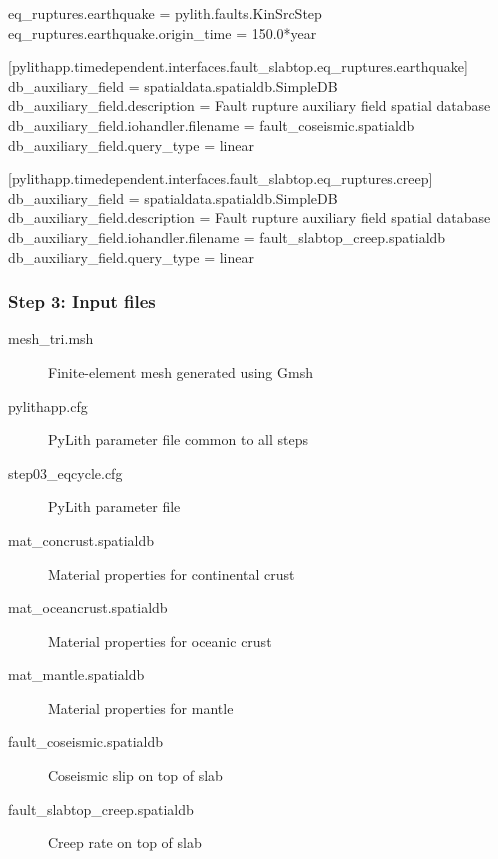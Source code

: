 \documentclass[aspectratio=169]{beamer}
\begin{document}
\begin{frame}[t,fragile]
\begin{minipage}[t]{0.67\textwidth}
\begin{onlyenv}
\begin{cfgcode}
        eq_ruptures.earthquake = pylith.faults.KinSrcStep
        eq_ruptures.earthquake.origin_time = 150.0*year

        [pylithapp.timedependent.interfaces.fault_slabtop.eq_ruptures.earthquake]
        db_auxiliary_field = spatialdata.spatialdb.SimpleDB
        db_auxiliary_field.description = Fault rupture auxiliary field spatial database
        db_auxiliary_field.iohandler.filename = fault_coseismic.spatialdb
        db_auxiliary_field.query_type = linear

        [pylithapp.timedependent.interfaces.fault_slabtop.eq_ruptures.creep]
        db_auxiliary_field = spatialdata.spatialdb.SimpleDB
        db_auxiliary_field.description = Fault rupture auxiliary field spatial database
        db_auxiliary_field.iohandler.filename = fault_slabtop_creep.spatialdb
        db_auxiliary_field.query_type = linear
      \end{cfgcode}
    \end{onlyenv}
  \end{minipage}

  
\end{frame}


\begin{frame}
  \frametitle{Step 3: Input files}
  \summary{}

  \begin{description}
  \item[mesh\_tri.msh] Finite-element mesh generated using Gmsh
  \item[pylithapp.cfg] PyLith parameter file common to all steps
  \item[step03\_eqcycle.cfg] PyLith parameter file
  \item[mat\_concrust.spatialdb] Material properties for continental crust
  \item[mat\_oceancrust.spatialdb] Material properties for oceanic crust
  \item[mat\_mantle.spatialdb] Material properties for mantle
  \item[fault\_coseismic.spatialdb] Coseismic slip on top of slab
  \item[fault\_slabtop\_creep.spatialdb] Creep rate on top of slab
  \end{description}
    
\end{frame}
\end{document}

